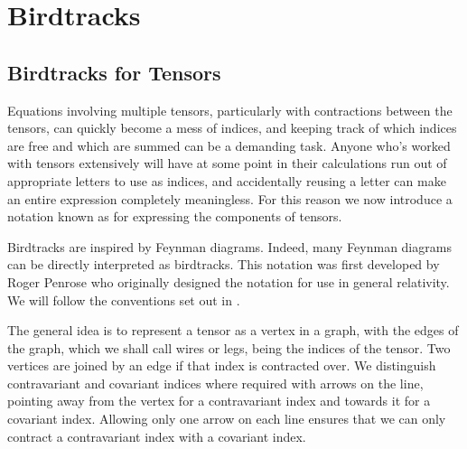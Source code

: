 \documentclass[fleqn]{NotesClass}
\begin{document}
    \section{Birdtracks}
    \subsection{Birdtracks for Tensors}
    Equations involving multiple tensors, particularly with contractions between the tensors, can quickly become a mess of indices, and keeping track of which indices are free and which are summed can be a demanding task.
    Anyone who's worked with tensors extensively will have at some point in their calculations run out of appropriate letters to use as indices, and accidentally reusing a letter can make an entire expression completely meaningless.
    For this reason we now introduce a notation known as  for expressing the components of tensors.
    
    Birdtracks are inspired by Feynman diagrams.
    Indeed, many Feynman diagrams can be directly interpreted as birdtracks.
    This notation was first developed by Roger Penrose \cites{penrose}[240]{penrose-road-to-reality} who originally designed the notation for use in general relativity.
    We will follow the conventions set out in \cite{cvitanovic}.
    
    The general idea is to represent a tensor as a vertex in a graph, with the edges of the graph, which we shall call wires or legs, being the indices of the tensor.
    Two vertices are joined by an edge if that index is contracted over.
    We distinguish contravariant and covariant indices where required with arrows on the line, pointing away from the vertex for a contravariant index and towards it for a covariant index.
    Allowing only one arrow on each line ensures that we can only contract a contravariant index with a covariant index.
    
\end{document}
